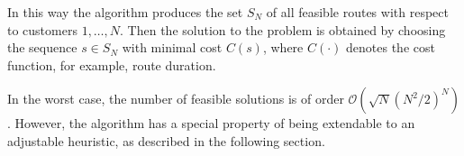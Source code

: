 \documentclass[dissertation,draft*]{aaltoseries}
\begin{document}
In this way the algorithm 
produces the set $S_N$ of all feasible routes with respect to customers $1,\ldots,N$. 
Then the solution to the problem is obtained by choosing the sequence $s \in S_N$ with
minimal cost $C(s)$, where $C(\cdot)$ denotes the cost function, for example, route duration. 

In the worst case, the number of feasible solutions is of order $\mathcal{O}(\sqrt{N} (N^2/2)^N)$.
However, the 
algorithm has a special property of being extendable to an adjustable heuristic,
as described in the following section.
\end{document}

